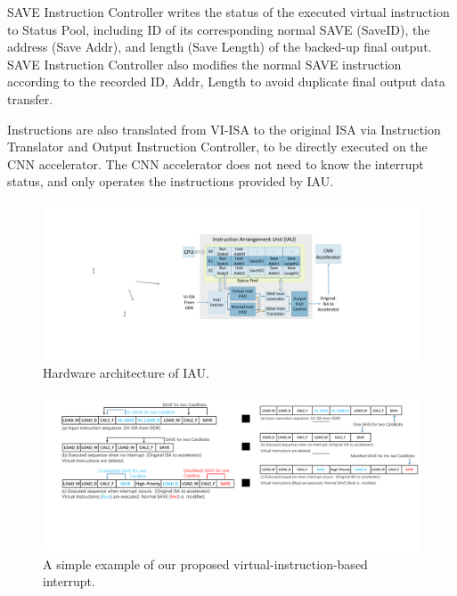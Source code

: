 SAVE Instruction Controller writes the status of the executed virtual instruction to Status Pool, including ID of its corresponding normal SAVE (SaveID), the address (Save Addr), and length (Save Length) of the backed-up final output.
SAVE Instruction Controller also modifies the normal SAVE instruction according to the recorded ID, Addr, Length to avoid duplicate final output data transfer.

Instructions are also translated from VI-ISA to the original ISA via Instruction Translator and Output Instruction Controller, to be directly executed on the CNN accelerator. The CNN accelerator does not need to know the interrupt status, and only operates the instructions provided by IAU.

\begin{figure}[t]
	\centering
 \vspace{-0.1cm} 
 \setlength{\abovecaptionskip}{0cm} 
	\includegraphics[width=0.9\linewidth]{fig/iau.pdf}
	\caption{Hardware architecture of IAU. 
	}
	\label{fig:IAU}
\end{figure}

\begin{figure}[t]
	\centering
 \vspace{-0.1cm} 
 \setlength{\abovecaptionskip}{0cm} 
 \setlength{\belowcaptionskip}{-0.5cm} 
	\includegraphics[width=0.99\linewidth]{fig/interexample.pdf}
	\caption{ A simple example of our proposed virtual-instruction-based interrupt. }
	\label{fig:interexample}
\end{figure}

